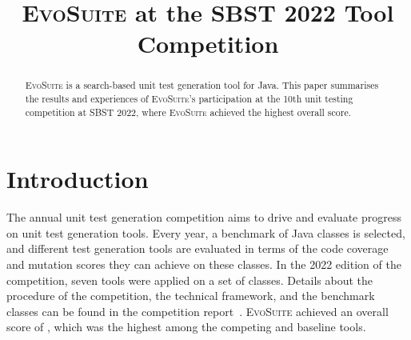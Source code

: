 \documentclass[sigconf,review,anonymous]{acmart}
\newcommand{\andrea}[1]{\textcolor{ScarletRed}{\sf\small\textbf{Andrea:} #1}}
\newcommand{\EVOSUITE}{\textsc{EvoSuite}\xspace}
\begin{document}
% 

\title{\EVOSUITE at the SBST 2022 Tool Competition}
 

\author{%
%
%
%
}


\begin{abstract}
  \EVOSUITE is a search-based unit test generation tool for Java. This paper summarises the results and experiences of \EVOSUITE's participation at the 10th unit testing competition at SBST 2022, where \EVOSUITE achieved the highest overall score.
\end{abstract}

\maketitle

\section{Introduction}
%
The annual unit test generation competition aims to drive and evaluate progress
on unit test generation tools. Every year, a benchmark of Java classes is
selected, and different test generation tools are evaluated in terms of the
code coverage and mutation scores they can achieve on these classes. In the
2022 edition of the competition, seven tools were applied on a set of \cuts classes.
Details about the procedure of the competition, the technical framework, and
the benchmark classes can be found in the competition report~\cite{SBST-toolcomp22}.
\EVOSUITE achieved an overall score of \score, which was the highest among the
competing and baseline tools.
\end{document}
